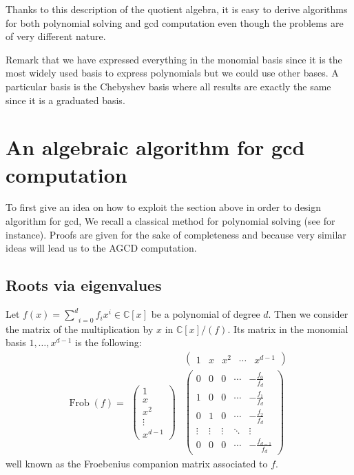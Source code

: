 \documentclass{article}
\newcommand{\tmop}[1]{\ensuremath{\operatorname{#1}}}
\begin{document}
Thanks to this description of the quotient algebra, it is easy to derive
algorithms for both polynomial solving and gcd computation even though the
problems are of very different nature.

Remark that we have expressed everything in the monomial basis since it is the
most widely used basis to express polynomials but we could use other bases. A
particular basis is the Chebyshev basis where all results are exactly the same
since it is a graduated basis.

\section{An algebraic algorithm for gcd computation\label{exact}}



To first give an idea on how to exploit the section above in order to design
algorithm for gcd, We recall a classical method for polynomial solving (see
{\cite{C}} for instance). Proofs are given for the sake of completeness and
because very similar ideas will lead us to the AGCD computation.

\subsection{Roots via eigenvalues}



Let $f (x) = \underset{i = 0}{\overset{d}{\sum}} f_i x^i \in \mathbb{C}[x]$
be a polynomial of degree $d$. Then we consider the matrix of the
multiplication by $x$ in $\mathbb{C}[x] / (f)$. Its matrix in the monomial
basis $1, \ldots, x^{d - 1}$ is the following:
\[ \tmop{Frob} (f) = \begin{array}{cc}
     & \left(\begin{array}{ccccc}
       1 & x & x^2 & \cdots & x^{d - 1}
     \end{array}\right)\\
     \left(\begin{array}{c}
       1\\
       x\\
       x^2\\
       \vdots\\
       x^{d - 1}
     \end{array}\right) & \text{$\left(\begin{array}{ccccc}
       0 & 0 & 0 & \cdots & - \frac{f_0}{f_d}\\
       1 & 0 & 0 & \cdots & - \frac{f_1}{f_d}\\
       0 & 1 & 0 & \cdots & - \frac{f_2}{f_d}\\
       \vdots & \vdots & \vdots & \ddots & \vdots\\
       0 & 0 & 0 & \cdots & - \frac{f_{d - 1}}{f_d}
     \end{array}\right)$}
   \end{array} \]
well known as the Froebenius companion matrix associated to $f$.
\end{document}

